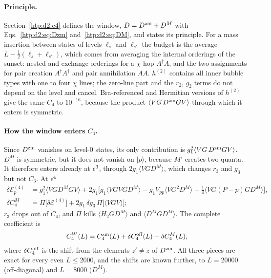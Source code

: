 \paragraph{Principle.} Section~\ref{htp:d2:c4} defines the window, $D=D^{\rm zm}+D^M$ with Eqs.~\eqref{htp:d2:eq:Dzm}
and~\eqref{htp:d2:eq:DM}, and states its principle. For a mass insertion between states of levels $\ell_s$ and $\ell_{s'}$ the
budget is the average $L-\frac12(\ell_s+\ell_{s'})$, which comes from averaging the internal orderings of the sunset: nested
and exchange orderings for a $\chi$ hop $A^\dagger A$, and the two assignments for pair creation $A^\dagger A^\dagger$ and pair
annihilation $AA$. $h^{(2)}$ contains all inner bubble types with one to four $\chi$ lines; the zero-line part and the $r_2$,
$g_2$ terms do not depend on the level and cancel. Bra-referenced and Hermitian versions of $h^{(2)}$ give the same $C_4$ to
$10^{-16}$, because the product $\langle VG\,D^{\rm zm}GV\rangle$ through which it enters is symmetric.

\paragraph{How the window enters $C_4$.} Since $D^{\rm zm}$ vanishes on level-0 states, its only contribution is
$g_1^2\langle VG\,D^{\rm zm}GV\rangle$. $D^M$ is symmetric, but it does not vanish on $|p\rangle$, because $M'$ creates two
quanta. It therefore enters already at $\epsilon^3$, through $2g_1\langle VGD^M\rangle$, which changes $r_3$ and $g_3$ but not $C_3$.
At $\epsilon^4$
\begin{align}
 \delta\mathcal E^{(4)}_p&=g_1^2\langle VGD^MGV\rangle+2g_1\big[g_1\langle VGVGD^M\rangle-g_1V_{pp}\langle VG^2D^M\rangle
 -\tfrac14\langle VG(P-p)GD^M\rangle\big],\nonumber\\
 \delta C_4^M&=\Pi\big[\delta\mathcal E^{(4)}\big]+2g_1\,\delta g_3\,\Pi\big[\langle VGV\rangle\big] ;
\end{align}
$r_3$ drops out of $C_4$, and $\Pi$ kills $\langle H_2GD^M\rangle$ and $\langle D^MGD^M\rangle$. The complete coefficient is
\begin{equation}
 C_4^W(L)=C_4^{\rm zm}(L)+\delta C_4^{\rm off}(L)+\delta C_4^M(L),
\end{equation}
where $\delta C_4^{\rm off}$ is the shift from the elements $z'\neq z$ of $D^{\rm zm}$. All three pieces are exact for every
even $L\le2000$, and the shifts are known further, to $L=20000$ (off-diagonal) and $L=8000$ ($D^M$).

